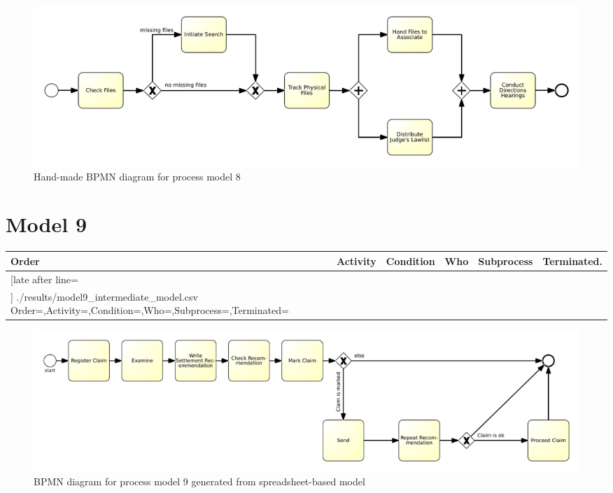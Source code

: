 \begin{figure}[H]
	\centering
	\includegraphics[width=\hsize]{./bpmn/model8.pdf}
	\caption{Hand-made BPMN diagram for process model 8}
	\label{bpmn:model8}
\end{figure}

\section{Model 9}
\begin{tcolorbox}[
	breakable,
	arc=0mm,
	left=1pt,
	right = 1pt,
	boxrule=0mm,
	colback = {white},
	]
	\texttt{}
\end{tcolorbox}
\label{txt:model9}

{\scriptsize
	\begin{longtable}{|p{0.03 \hsize}|p{0.25 \hsize}|p{0.15 \hsize}|p{0.2 \hsize}|p{0.1 \hsize}|p{0.1 \hsize}|}
		\hline
		Order & Activity & Condition & Who & Subprocess & Terminated.
		\\\hline\hline
		\csvreader[late after line=\\\hline]
		{./results/model9_intermediate_model.csv}
		{Order=\Order,Activity=\Activity,Condition=\Condition,Who=\Who,Subprocess=\Subprocess,Terminated=\Terminated}
		{\Order & \Activity & \Condition & \Who & \Subprocess & \Terminated}
		\caption{Spreadsheet-based description for process model 9}
		\label{csv:model9}
	\end{longtable}
}

\begin{figure}[H]
	\centering
	\includegraphics[width=\hsize]{./generated_bpmn/model9.pdf}
	\caption{BPMN diagram for process model 9 generated from spreadsheet-based model}
	\label{bpmn:generated_model9}
\end{figure}

